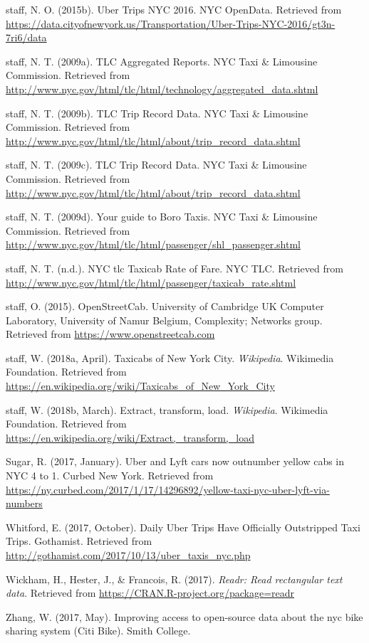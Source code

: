 \documentclass[12pt,twoside]{reedthesis}
\theoremstyle{definition}
\theoremstyle{definition}
\theoremstyle{definition}
\theoremstyle{remark}
\begin{document}
\hypertarget{ref-datauberweek}{}
staff, N. O. (2015b). Uber Trips NYC 2016. NYC OpenData. Retrieved from
\url{https://data.cityofnewyork.us/Transportation/Uber-Trips-NYC-2016/gt3n-7ri6/data}

\hypertarget{ref-datayellowmonth}{}
staff, N. T. (2009a). TLC Aggregated Reports. NYC Taxi \& Limousine
Commission. Retrieved from
\url{http://www.nyc.gov/html/tlc/html/technology/aggregated_data.shtml}

\hypertarget{ref-datayellow}{}
staff, N. T. (2009b). TLC Trip Record Data. NYC Taxi \& Limousine
Commission. Retrieved from
\url{http://www.nyc.gov/html/tlc/html/about/trip_record_data.shtml}

\hypertarget{ref-datauber}{}
staff, N. T. (2009c). TLC Trip Record Data. NYC Taxi \& Limousine
Commission. Retrieved from
\url{http://www.nyc.gov/html/tlc/html/about/trip_record_data.shtml}

\hypertarget{ref-greentaxi}{}
staff, N. T. (2009d). Your guide to Boro Taxis. NYC Taxi \& Limousine
Commission. Retrieved from
\url{http://www.nyc.gov/html/tlc/html/passenger/shl_passenger.shtml}

\hypertarget{ref-tlcfarerate}{}
staff, N. T. (n.d.). NYC tlc Taxicab Rate of Fare. NYC TLC. Retrieved
from \url{http://www.nyc.gov/html/tlc/html/passenger/taxicab_rate.shtml}

\hypertarget{ref-appone}{}
staff, O. (2015). OpenStreetCab. University of Cambridge UK Computer
Laboratory, University of Namur Belgium, Complexity; Networks group.
Retrieved from \url{https://www.openstreetcab.com}

\hypertarget{ref-wikipediataxi}{}
staff, W. (2018a, April). Taxicabs of New York City. \emph{Wikipedia}.
Wikimedia Foundation. Retrieved from
\url{https://en.wikipedia.org/wiki/Taxicabs_of_New_York_City}

\hypertarget{ref-wikipedia}{}
staff, W. (2018b, March). Extract, transform, load. \emph{Wikipedia}.
Wikimedia Foundation. Retrieved from
\url{https://en.wikipedia.org/wiki/Extract,_transform,_load}

\hypertarget{ref-sugar2017}{}
Sugar, R. (2017, January). Uber and Lyft cars now outnumber yellow cabs
in NYC 4 to 1. Curbed New York. Retrieved from
\url{https://ny.curbed.com/2017/1/17/14296892/yellow-taxi-nyc-uber-lyft-via-numbers}

\hypertarget{ref-emma2017}{}
Whitford, E. (2017, October). Daily Uber Trips Have Officially
Outstripped Taxi Trips. Gothamist. Retrieved from
\url{http://gothamist.com/2017/10/13/uber_taxis_nyc.php}

\hypertarget{ref-pkgreadr}{}
Wickham, H., Hester, J., \& Francois, R. (2017). \emph{Readr: Read
rectangular text data}. Retrieved from
\url{https://CRAN.R-project.org/package=readr}

\hypertarget{ref-zhang2017}{}
Zhang, W. (2017, May). Improving access to open-source data about the
nyc bike sharing system (Citi Bike). Smith College.


\end{document}
